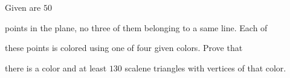 Given are $50$

 points in the plane, no three of them belonging to a same line. Each of

 these points is colored using one of four given colors. Prove that 

there is a color and at least $130$ scalene triangles with vertices of that color.